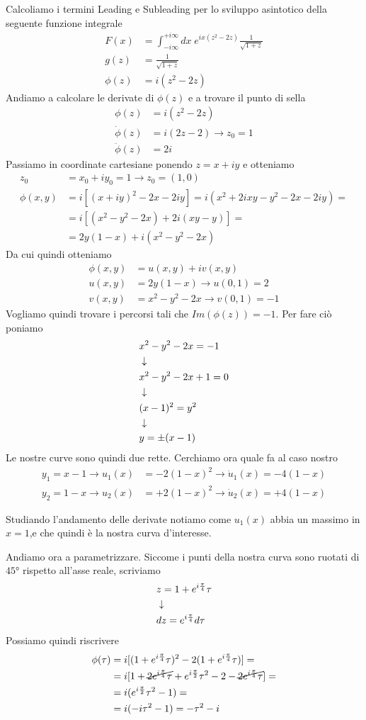 Calcoliamo i termini Leading e Subleading per lo sviluppo asintotico della seguente funzione integrale
\begin{align}
	F(x) &= \int_{-i\infty}^{+i\infty} dx \; e^{ix(z^2-2z)} \frac{1}{\sqrt{1+z}}\\
	g(z) &=\frac{1}{\sqrt{1+z}}\\
	\phi(z) &= i(z^2-2z)
\end{align}
Andiamo a calcolare le derivate di $\phi(z)$ e a trovare il punto di sella
\begin{align}
	\phi(z) &= i(z^2-2z)\\
	\dot{\phi}(z) &= i(2z-2) \to z_0=1\\
	\ddot{\phi}(z) &= 2i
\end{align}
Passiamo in coordinate cartesiane ponendo $z = x+iy$ e otteniamo
\begin{align}
	z_0 &= x_0 + iy_0 = 1 \to z_0=(1,0)\\
	\phi(x,y) &= i[( x+iy )^2 -2x -2iy] = i( x^2 + 2ixy -y^2  -2x -2iy) = \nonumber\\
	&= i[( x^2 -y^2 -2x ) + 2i (xy -y)]  = \nonumber\\
	&=2y(1-x) + i( x^2 -y^2 -2x )
\end{align}
Da cui quindi otteniamo
\begin{align}
	\phi(x,y) &= u(x,y) + iv(x,y)\\
	u(x,y) &= 2y(1-x) \to u(0,1) = 2\\
	v(x,y) &= x^2 -y^2 -2x \to v(0,1) = -1
\end{align}
Vogliamo quindi trovare i percorsi tali che $Im(\phi(z)) = -1$. Per fare ciò poniamo
\begin{align}
	&x^2 -y^2 -2x = -1\\ &\downarrow \nonumber \\
	&x^2 -y^2 -2x +1 =0\nonumber \\ &\downarrow \nonumber \\
	&(x-1)^2 = y^2\nonumber \\ &\downarrow \nonumber \\
	&y=\pm(x-1)
\end{align}
Le nostre curve sono quindi due rette. Cerchiamo ora quale fa al caso nostro
\begin{align}
	y_1=x-1 \to u_1(x) &= -2(1-x)^2 \to \dot{u}_1(x) = -4(1-x)\\
	y_2=1-x \to u_2(x) &= +2(1-x)^2 \to \dot{u}_2(x) = +4(1-x)
\end{align}

Studiando l'andamento delle derivate notiamo come $u_1(x)$ abbia un massimo in $x=1$,e che quindi è la nostra curva d'interesse.

Andiamo ora a parametrizzare. Siccome i punti della nostra curva sono ruotati di $45°$ rispetto all'asse reale, scriviamo
\begin{align}
	&z = 1+ e^{i\frac{\pi}{4}} \tau\\ &\downarrow \nonumber \\
	&dz = e^{i\frac{\pi}{4}} d\tau
\end{align}	
Possiamo quindi riscrivere
\begin{align}	
	\phi(\tau) &= i[(1+ e^{i\frac{\pi}{4}} \tau)^2-2(1+ e^{i\frac{\pi}{4}} \tau)] =\nonumber\\
	&= i[ 1 + \cancel{2e^{i\frac{\pi}{4}}\tau} + e^{i\frac{\pi}{2}}\tau^2 - 2 -\cancel{2e^{i\frac{\pi}{4}}\tau} ]=\nonumber\\
	&= i (e^{i\frac{\pi}{2}}\tau^2 -1)=\nonumber\\
	&= i (-i\tau^2 -1) = -\tau^2 -i
\end{align}

